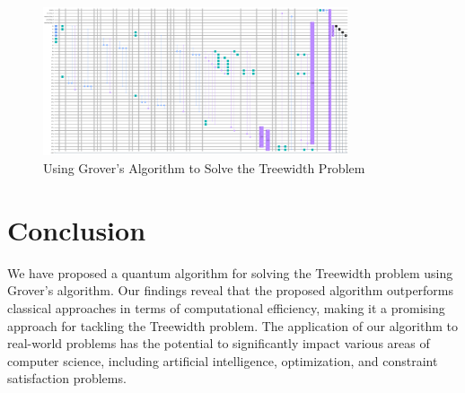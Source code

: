 \begin{figure}[htp]
    \centering
    \includegraphics[width=9cm]{Figures/Treewidth_circuit.png}
    \caption{Using Grover's Algorithm to Solve the Treewidth Problem}
    \label{fig:Treewidth}
\end{figure}

\section{Conclusion} \label{sec:conclusion}

We have proposed a quantum algorithm for solving the Treewidth problem using Grover's algorithm. Our findings reveal that the proposed algorithm outperforms classical approaches in terms of computational efficiency, making it a promising approach for tackling the Treewidth problem. The application of our algorithm to real-world problems has the potential to significantly impact various areas of computer science, including artificial intelligence, optimization, and constraint satisfaction problems.

